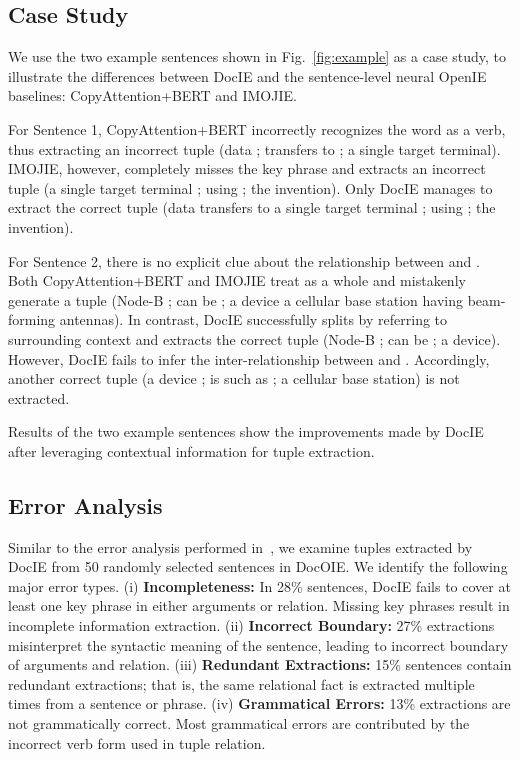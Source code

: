 \documentclass[11pt,a4paper]{article}
\newcommand{\dname}{DocOIE\xspace}
\newcommand{\mname}{DocIE\xspace}
\begin{document}
\subsection{Case Study}


We use the two example sentences shown in Fig.~\ref{fig:example} as a case study, to illustrate the differences between \mname and the sentence-level neural OpenIE baselines: CopyAttention+BERT and IMOJIE.

For Sentence 1, CopyAttention+BERT incorrectly recognizes the word  as a verb, thus extracting an incorrect tuple (data ; transfers to ; a single target terminal). IMOJIE, however, completely misses the key phrase  and extracts an incorrect tuple (a single target terminal ; using ; the invention). Only \mname manages to extract the correct tuple (data transfers to a single target terminal ; using ; the invention).

For Sentence 2, there is no explicit clue about the relationship between  and . Both CopyAttention+BERT and IMOJIE treat  as a whole and
mistakenly generate a tuple (Node-B ; can be ; a device a cellular base station having beam-forming antennas). In contrast, \mname successfully splits  by referring to surrounding context and extracts the correct tuple (Node-B ; can be ; a device). However, \mname fails to infer the inter-relationship between  and . Accordingly, another correct tuple (a device ; is such as ; a cellular base station) is not extracted.

Results of the two example sentences show the improvements made by \mname after leveraging contextual information for tuple extraction. 


\subsection{Error Analysis}


Similar to the error analysis performed in~\cite{kolluru2020imojie}, we examine tuples extracted by \mname from 50 randomly selected sentences in \dname. We identify the following major error types. (i) \textbf{Incompleteness:} In 28\% sentences, \mname fails to cover at least one key phrase in either arguments or relation. Missing key phrases result in incomplete information extraction. (ii) \textbf{Incorrect Boundary:} 27\% extractions misinterpret the syntactic meaning of the sentence, leading to incorrect boundary of arguments and relation. (iii) \textbf{Redundant Extractions:} 15\% sentences contain redundant extractions; that is, the same relational fact is extracted multiple times from a sentence or phrase. (iv) \textbf{Grammatical Errors:} 13\% extractions are not grammatically correct. Most  grammatical errors are contributed by the incorrect verb form used in tuple relation.
\end{document}
